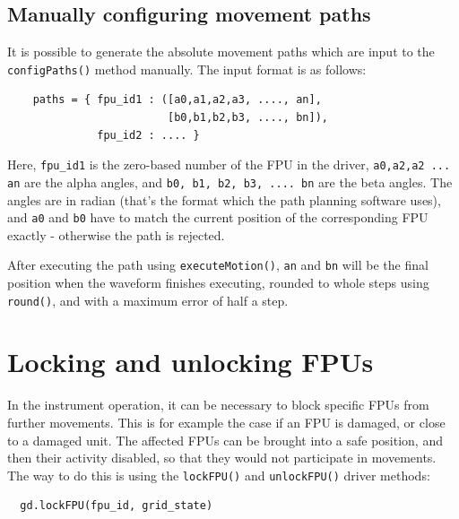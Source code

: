 \documentclass[fontsize=12,a4paper]{scrreprt}
\begin{document}
\subsection{Manually configuring movement paths}
\label{sec:manuallyconfiguringpaths}%
%
%
%
%
It is possible to generate the absolute movement paths which are input
to the \texttt{configPaths()} method manually.  The input format is as
follows:

\begin{verbatim}
    paths = { fpu_id1 : ([a0,a1,a2,a3, ...., an],
                         [b0,b1,b2,b3, ...., bn]),
              fpu_id2 : .... }
\end{verbatim}

Here, \verb+fpu_id1+ is the zero-based number of the FPU in the
driver, \verb+a0,a2,a2 ... an+ are the alpha angles, and
\verb+b0, b1, b2, b3, .... bn+ are the beta angles. The angles are in
radian (that's the format which the path planning software uses), and
\verb+a0+ and \verb+b0+ have to match the current position of the
corresponding FPU exactly - otherwise the path is rejected.

After executing the path using \texttt{executeMotion()}, \verb+an+ and
\verb+bn+ will be the final position when the waveform finishes
executing, rounded to whole steps using \texttt{round()}, and with a
maximum error of half a step.


\section{Locking and unlocking FPUs}
\label{sec:lockingFPUs}%
%
%
%
%
%
%
%
In the instrument operation, it can be necessary to block specific FPUs from
further movements. This is for example the case if an FPU is damaged,
or close to a damaged unit. The affected FPUs can be brought into a
safe position, and then their activity disabled, so that they would
not participate in movements. The way to do this is using the
\texttt{lockFPU()} and \texttt{unlockFPU()} driver methods:

\begin{verbatim}
  gd.lockFPU(fpu_id, grid_state)
\end{verbatim}
\end{document}
